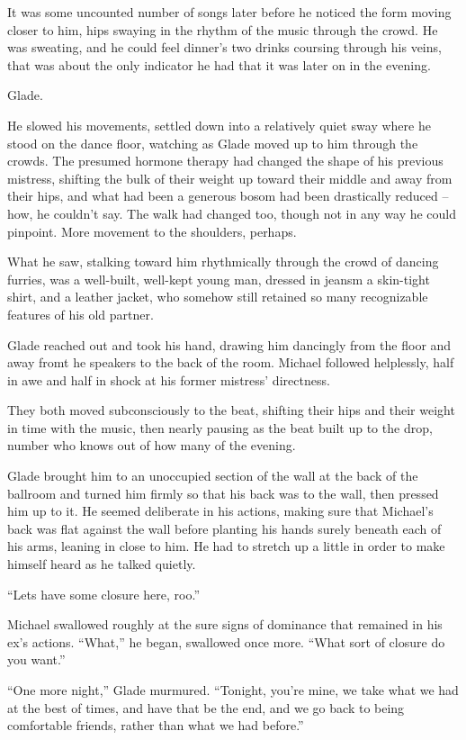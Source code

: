\documentclass[12pt,letterpaper,oneside]{memoir}
\begin{document}
  It was some uncounted number of songs later before he noticed the form moving closer to him, hips swaying in the rhythm of the music through the crowd.  He was sweating, and he could feel dinner's two drinks coursing through his veins, that was about the only indicator he had that it was later on in the evening.

  Glade.

  He slowed his movements, settled down into a relatively quiet sway where he stood on the dance floor, watching as Glade moved up to him through the crowds.  The presumed hormone therapy had changed the shape of his previous mistress, shifting the bulk of their weight up toward their middle and away from their hips, and what had been a generous bosom had been drastically reduced -- how, he couldn't say.  The walk had changed too, though not in any way he could pinpoint.  More movement to the shoulders, perhaps.

  What he saw, stalking toward him rhythmically through the crowd of dancing furries, was a well-built, well-kept young man, dressed in jeansm a skin-tight shirt, and a leather jacket, who somehow still retained so many recognizable features of his old partner.

  Glade reached out and took his hand, drawing him dancingly from the floor and away fromt he speakers to the back of the room.  Michael followed helplessly, half in awe and half in shock at his former mistress' directness.

  They both moved subconsciously to the beat, shifting their hips and their weight in time with the music, then nearly pausing as the beat built up to the drop, number who knows out of how many of the evening.

  Glade brought him to an unoccupied section of the wall at the back of the ballroom and turned him firmly so that his back was to the wall, then pressed him up to it.  He seemed deliberate in his actions, making sure that Michael's back was flat against the wall before planting his hands surely beneath each of his arms, leaning in close to him.  He had to stretch up a little in order to make himself heard as he talked quietly.

  ``Lets have some closure here, roo.''

  Michael swallowed roughly at the sure signs of dominance that remained in his ex's actions.  ``What,'' he began, swallowed once more.  ``What sort of closure do you want.''

  ``One more night,'' Glade murmured.  ``Tonight, you're mine, we take what we had at the best of times, and have that be the end, and we go back to being comfortable friends, rather than what we had before.''
\end{document}
